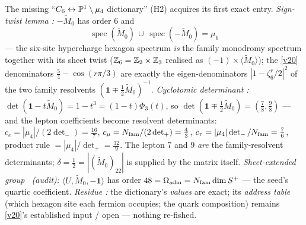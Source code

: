 \begin{keybox}
The missing ``$C_6\leftrightarrow\mathbb P^1\setminus\mu_4$ dictionary'' (H2) acquires its first exact entry.
\emph{Sign-twist lemma \mE:} $-\widetilde M_0$ has order $6$ and
\[
  \boxed{\ \operatorname{spec}(\widetilde M_0)\,\cup\,\operatorname{spec}(-\widetilde M_0)=\mu_6\ }
\]
--- the six-site hypercharge hexagon spectrum \emph{is} the family monodromy spectrum together with its
sheet twist ($\mathbb Z_6=\mathbb Z_2\times\mathbb Z_3$ realised as $(-1)\times\langle\widetilde M_0\rangle$); the \vref{v20}
denominators $\tfrac54-\cos(r\pi/3)$ are exactly the eigen-denominators $|1-\zeta_6^r/2|^2$ of the two
family resolvents $(\mathbf1\mp\tfrac12\widetilde M_0)^{-1}$. \emph{Cyclotomic determinant \mE:}
$\det(\mathbf1-t\widetilde M_0)=1-t^3=(1-t)\Phi_3(t)$, so $\det(\mathbf1\mp\tfrac12\widetilde M_0)=
(\tfrac78,\tfrac98)$ --- and the lepton coefficients become resolvent determinants:
$c_e=|\mu_4|/(2\det_-)=\tfrac{16}7$, $c_\mu=N_{\mathrm{fam}}/(2\det_+)=\tfrac43$,
$c_\tau=|\mu_4|\det_-/N_{\mathrm{fam}}=\tfrac76$, product rule $=|\mu_4|/\det_+=\tfrac{32}9$. The lepton $7$ and
$9$ \emph{are} the family-resolvent determinants; $\delta=\tfrac12=|(\widetilde M_0)_{22}|$ is supplied
by the matrix itself. \emph{Sheet-extended group \mE\ (audit):} $\langle U,\widetilde M_0,-\mathbf1\rangle$
has order $48=\Omega_{\mathrm{adm}}=N_{\mathrm{fam}}\dim S^+$ --- the seed's quartic coefficient. \emph{Residue \mC:} the
dictionary's \emph{values} are exact; its \emph{address table} (which hexagon site each fermion
occupies; the quark composition) remains \vref{v20}'s established input / open --- nothing re-fished.
\end{keybox}
